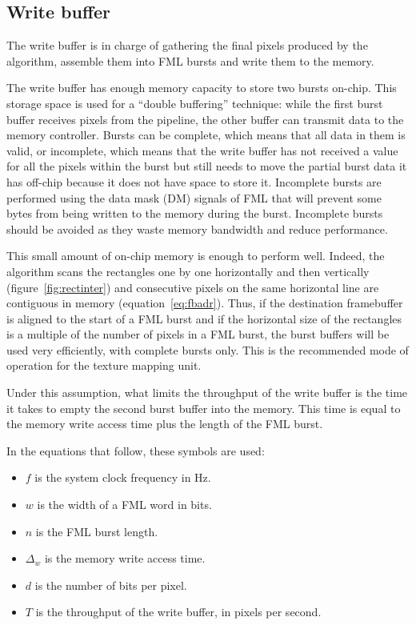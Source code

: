 \documentclass[a4paper,11pt]{kthesis}
\begin{document}
\subsection{Write buffer}
The write buffer is in charge of gathering the final pixels produced by the algorithm, assemble them into FML bursts and write them to the memory.

The write buffer has enough memory capacity to store two bursts on-chip. This storage space is used for a ``double buffering'' technique: while the first burst buffer receives pixels from the pipeline, the other buffer can transmit data to the memory controller. Bursts can be complete, which means that all data in them is valid, or incomplete, which means that the write buffer has not received a value for all the pixels within the burst but still needs to move the partial burst data it has off-chip because it does not have space to store it. Incomplete bursts are performed using the data mask (DM) signals of FML that will prevent some bytes from being written to the memory during the burst. Incomplete bursts should be avoided as they waste memory bandwidth and reduce performance.

This small amount of on-chip memory is enough to perform well. Indeed, the algorithm scans the rectangles one by one horizontally and then vertically (figure~\ref{fig:rectinter}) and consecutive pixels on the same horizontal line are contiguous in memory (equation~\ref{eq:fbadr}). Thus, if the destination framebuffer is aligned to the start of a FML burst and if the horizontal size of the rectangles is a multiple of the number of pixels in a FML burst, the burst buffers will be used very efficiently, with complete bursts only. This is the recommended mode of operation for the texture mapping unit.

Under this assumption, what limits the throughput of the write buffer is the time it takes to empty the second burst buffer into the memory. This time is equal to the memory write access time plus the length of the FML burst.

In the equations that follow, these symbols are used:
\begin{itemize}
\item $f$ is the system clock frequency in Hz.
\item $w$ is the width of a FML word in bits.
\item $n$ is the FML burst length.
\item $\Delta_{w}$ is the memory write access time.
\item $d$ is the number of bits per pixel.
\item $T$ is the throughput of the write buffer, in pixels per second.
\end{itemize}
\end{document}
